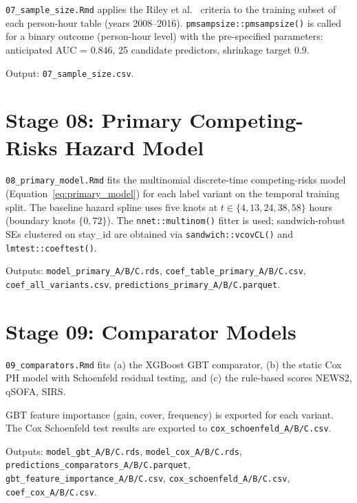 \texttt{07\_sample\_size.Rmd} applies the Riley et al.\ \parencite{riley2019sample}
criteria to the training subset of each person-hour table (years 2008--2016).
\texttt{pmsampsize::pmsampsize()} is called for a binary outcome (person-hour
level) with the pre-specified parameters: anticipated AUC = 0.846, 25 candidate
predictors, shrinkage target 0.9.

Output: \texttt{07\_sample\_size.csv}.

\section{Stage 08: Primary Competing-Risks Hazard Model}

\texttt{08\_primary\_model.Rmd} fits the multinomial discrete-time competing-risks
model (Equation~\ref{eq:primary_model}) for each label variant on the temporal
training split. The baseline hazard spline uses five knots at
$t \in \{4, 13, 24, 38, 58\}$ hours (boundary knots $\{0, 72\}$). The
\texttt{nnet::multinom()} fitter is used; sandwich-robust SEs clustered on
stay\_id are obtained via \texttt{sandwich::vcovCL()} and \texttt{lmtest::coeftest()}.

Outputs: \texttt{model\_primary\_A/B/C.rds}, \texttt{coef\_table\_primary\_A/B/C.csv},
\texttt{coef\_all\_variants.csv}, \texttt{predictions\_primary\_A/B/C.parquet}.

\section{Stage 09: Comparator Models}

\texttt{09\_comparators.Rmd} fits (a) the XGBoost GBT comparator,
(b) the static Cox PH model with Schoenfeld residual testing, and
(c) the rule-based scores NEWS2, qSOFA, SIRS.

GBT feature importance (gain, cover, frequency) is exported for each variant.
The Cox Schoenfeld test results are exported to \texttt{cox\_schoenfeld\_A/B/C.csv}.

Outputs: \texttt{model\_gbt\_A/B/C.rds}, \texttt{model\_cox\_A/B/C.rds},
\texttt{predictions\_comparators\_A/B/C.parquet},
\texttt{gbt\_feature\_importance\_A/B/C.csv}, \texttt{cox\_schoenfeld\_A/B/C.csv},
\texttt{coef\_cox\_A/B/C.csv}.

